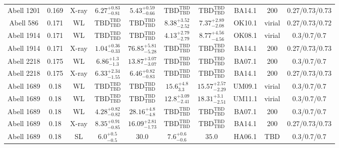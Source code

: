\begin{table}
\begin{tabular}{cccccccccc}
Abell 1201 & 0.169 & X-ray & ${6.27}^{+0.83}_{-0.81}$ & ${5.43}^{+0.59}_{-0.66}$ & ${\mathrm{TBD}}^{\mathrm{TBD}}_{\mathrm{TBD}}$ & ${\mathrm{TBD}}^{\mathrm{TBD}}_{\mathrm{TBD}}$ & BA14.1 & 200 & 0.27/0.73/0.73 \\
Abell 586 & 0.171 & WL & ${\mathrm{TBD}}^{\mathrm{TBD}}_{\mathrm{TBD}}$ & ${\mathrm{TBD}}^{\mathrm{TBD}}_{\mathrm{TBD}}$ & ${8.38}^{+3.52}_{-2.52}$ & ${7.37}^{+2.89}_{-2.08}$ & OK10.1 & virial & 0.27/0.73/0.72 \\
Abell 1914 & 0.171 & WL & ${\mathrm{TBD}}^{\mathrm{TBD}}_{\mathrm{TBD}}$ & ${\mathrm{TBD}}^{\mathrm{TBD}}_{\mathrm{TBD}}$ & ${4.13}^{+2.79}_{-2.79}$ & ${8.77}^{+4.56}_{-4.56}$ & OK08.1 & virial & 0.3/0.7/0.7 \\
Abell 1914 & 0.171 & X-ray & ${1.04}^{+0.36}_{-0.33}$ & ${76.85}^{+5.81}_{-5.28}$ & ${\mathrm{TBD}}^{\mathrm{TBD}}_{\mathrm{TBD}}$ & ${\mathrm{TBD}}^{\mathrm{TBD}}_{\mathrm{TBD}}$ & BA14.1 & 200 & 0.27/0.73/0.73 \\
Abell 2218 & 0.175 & WL & ${6.86}^{+1.3}_{-1.3}$ & ${13.87}^{+3.07}_{-3.07}$ & ${\mathrm{TBD}}^{\mathrm{TBD}}_{\mathrm{TBD}}$ & ${\mathrm{TBD}}^{\mathrm{TBD}}_{\mathrm{TBD}}$ & BA07.1 & 200 & 0.3/0.7/0.7 \\
Abell 2218 & 0.175 & X-ray & ${6.33}^{+2.34}_{-1.55}$ & ${6.46}^{+0.82}_{-0.83}$ & ${\mathrm{TBD}}^{\mathrm{TBD}}_{\mathrm{TBD}}$ & ${\mathrm{TBD}}^{\mathrm{TBD}}_{\mathrm{TBD}}$ & BA14.1 & 200 & 0.27/0.73/0.73 \\
Abell 1689 & 0.18 & WL & ${\mathrm{TBD}}^{\mathrm{TBD}}_{\mathrm{TBD}}$ & ${\mathrm{TBD}}^{\mathrm{TBD}}_{\mathrm{TBD}}$ & ${15.6}^{+4.8}_{3.3}$ & ${15.57}^{+2.57}_{-2.29}$ & UM09.1 & virial & 0.3/0.7/0.7 \\
Abell 1689 & 0.18 & WL & ${\mathrm{TBD}}^{\mathrm{TBD}}_{\mathrm{TBD}}$ & ${\mathrm{TBD}}^{\mathrm{TBD}}_{\mathrm{TBD}}$ & ${12.8}^{+3.09}_{-2.41}$ & ${18.31}^{+3.1}_{-2.51}$ & UM11.1 & virial & 0.3/0.7/0.7 \\
Abell 1689 & 0.18 & WL & ${4.28}^{+0.82}_{-0.82}$ & ${28.16}^{+4.8}_{-4.8}$ & ${\mathrm{TBD}}^{\mathrm{TBD}}_{\mathrm{TBD}}$ & ${\mathrm{TBD}}^{\mathrm{TBD}}_{\mathrm{TBD}}$ & BA07.1 & 200 & 0.3/0.7/0.7 \\
Abell 1689 & 0.18 & X-ray & ${8.35}^{+0.91}_{-0.85}$ & ${16.09}^{+2.81}_{-1.73}$ & ${\mathrm{TBD}}^{\mathrm{TBD}}_{\mathrm{TBD}}$ & ${\mathrm{TBD}}^{\mathrm{TBD}}_{\mathrm{TBD}}$ & BA14.1 & 200 & 0.27/0.73/0.73 \\
Abell 1689 & 0.18 & SL & ${6.0}^{+0.5}_{-0.5}$ & ${30.0}^{}_{}$ & ${7.6}^{+0.6}_{-0.6}$ & ${35.0}^{}_{}$ & HA06.1 & TBD & 0.3/0.7/0.7 \\

\end{tabular}
\end{table}
